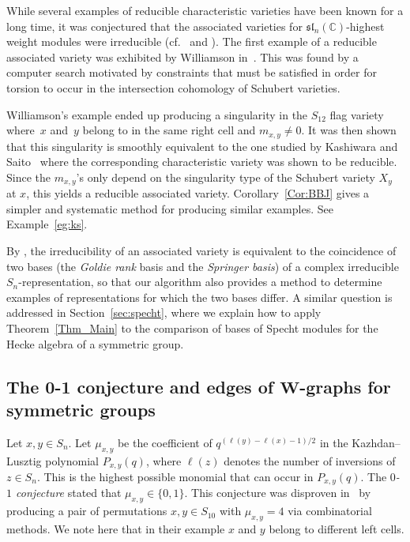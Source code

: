 \documentclass[10pt,a4paper]{amsart}
\numberwithin{equation}{section}
\begin{document}
While several examples of reducible characteristic varieties have been known for a long time, it was conjectured that the associated varieties for $\mathfrak{sl}_n(\mathbb{C})$-highest weight modules were irreducible (cf.\ \cite[Conjecture~4.5]{BB} and \cite[Section~10.2]{J}). The first example of a reducible associated variety was exhibited by Williamson in~\cite{williamson}.
This was found by a computer search motivated by constraints that must be satisfied in order for torsion to occur in the intersection cohomology of Schubert varieties.

Williamson's example ended up producing a singularity in the $S_{12}$ flag variety where~$x$ and~$y$ belong to in the same right cell and $m_{x,y}\neq 0$. It was then shown that this singularity is smoothly equivalent to the one studied by Kashiwara and Saito~\cite{kashiwarasaito} where the corresponding characteristic variety was shown to be reducible. Since the $m_{x,y}$'s only depend on the singularity type of the Schubert variety $X_y$ at $x$, this yields a reducible associated variety.
Corollary~\ref{Cor:BBJ} gives a simpler and systematic method for producing similar examples. See Example~\ref{eg:ks}.

\begin{Remark}By \cite[Section~3.1(A)]{tanisaki}, the irreducibility of an associated variety is equivalent to the coincidence of two bases (the \emph{Goldie rank} basis and the \emph{Springer basis}) of a complex irreducible $S_n$-representation, so that our algorithm also provides a method to determine examples of representations for which the two bases differ. A similar question is addressed in Section~\ref{sec:specht}, where we explain how to apply Theorem~\ref{Thm_Main} to the comparison of bases of Specht modules for the Hecke algebra of a symmetric group.
\end{Remark}

\subsection[The 0-1 conjecture and edges of W-graphs for symmetric groups]{The 0-1 conjecture and edges of $\boldsymbol{W}$-graphs for symmetric groups}\label{Sec_01}

Let $x,y\in S_n$.
Let $\mu_{x,y}$ be the coefficient of $q^{(\ell(y)-\ell(x)-1)/2}$ in the Kazhdan--Lusztig polynomial $P_{x,y}(q)$, where $\ell(z)$ denotes the number of inversions of $z\in S_n$. This is the highest possible monomial that can occur in $P_{x,y}(q)$.
The \emph{$0$-$1$ conjecture} stated that $\mu_{x,y}\in \{0,1\}$. This conjecture was disproven in~\cite{mclarnanwarrington} by producing a pair of permutations $x,y\in S_{10}$ with $\mu_{x,y}=4$ via combinatorial methods. We note here that in their example $x$ and $y$ belong to different left cells.
\end{document}
